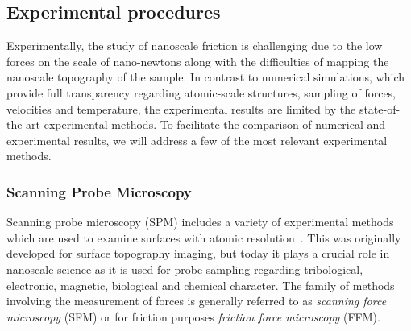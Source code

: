 



\subsection{Experimental procedures}

Experimentally, the study of nanoscale friction is challenging due to the low
forces on the scale of nano-newtons along with the difficulties of mapping the
nanoscale topography of the sample. In contrast to numerical simulations, which provide full
transparency regarding atomic-scale structures, sampling of forces, velocities
and temperature, the experimental results are limited by the state-of-the-art
experimental methods. To facilitate the comparison of numerical and experimental results, we will address a few of the most relevant experimental methods.


\subsubsection{Scanning Probe Microscopy}\label{sec:SPM} 
Scanning probe microscopy (\acrshort{SPM}) includes a variety of experimental
methods which are used to examine surfaces with atomic resolution~\cite[pp.
6--27]{BHUSHAN20051507}. This was originally developed for surface topography
imaging, but today it plays a crucial role in nanoscale science as it is used
for probe-sampling regarding tribological, electronic, magnetic, biological and
chemical character. The family of methods involving the measurement of forces is
generally referred to as \textit{scanning force microscopy} (\acrshort{SFM})
or for friction purposes \textit{friction force microscopy} (\acrshort{FFM}).

